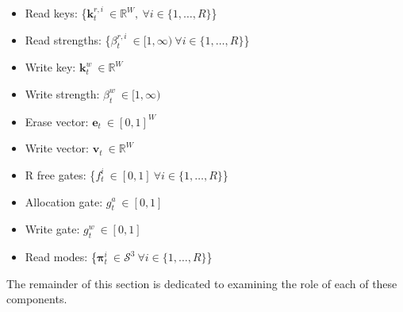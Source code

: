 \documentclass[]{article}
\begin{document}
\vspace{10pt}
\hspace{-40pt}
\begin{minipage}{0.6\textwidth}
\begin{itemize}
\item Read keys: \{$\pmb{k}_t^{r,i} \ \in \mathbb{R}^W, \ \forall i \in \{1,\dots,R\}$\}
\item Read strengths: \{$\beta_t^{r,i} \ \in [1, \infty) \ \forall i \in \{1,\dots,R\}$\}
\item Write key: $\pmb{k}_t^w \ \in \mathbb{R}^W$
\item Write strength: $\beta_t^w \ \in [1, \infty)$
\item Erase vector: $\pmb{e}_t \ \in [0,1]^W$
\end{itemize}
\end{minipage}
\hspace{-20pt}
\begin{minipage}{0.5\textwidth}
\begin{itemize}
\item Write vector: $\pmb{v}_t \ \in \mathbb{R}^W$
\item R free gates: \{$f_t^i \ \in [0,1] \ \forall i \in \{1,\dots,R\}$\}
\item Allocation gate: $g_t^a \ \in [0,1]$
\item Write gate: $g_t^w \ \in [0,1]$
\item Read modes: \{$\pmb{\pi}_t^i \ \in \mathcal{S}^3 \ \forall i \in \{1,\dots,R\}$\}
\end{itemize}
\end{minipage}
\vspace{10pt}

The remainder of this section is dedicated to examining the role of each of these components.
\end{document}
